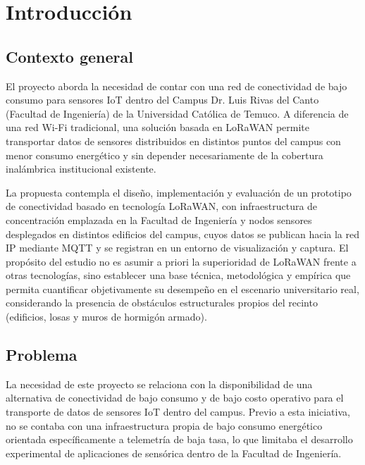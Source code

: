 \documentclass[12pt,oneside,openany,spanish,oldfontcommands]{memoir}
\begin{document}
\clearpage
{}
\setcounter{page}{1}
\pagestyle{mainstyle}

\chapter{Introducción}

\section{Contexto general}

El proyecto aborda la necesidad de contar con una red de conectividad de bajo consumo
para sensores IoT dentro del Campus Dr. Luis Rivas del Canto (Facultad de Ingeniería) de
la Universidad Católica de Temuco. A diferencia de una red Wi-Fi tradicional, una solución
basada en LoRaWAN permite transportar datos de sensores distribuidos en distintos
puntos del campus con menor consumo energético y sin depender necesariamente de la
cobertura inalámbrica institucional existente.

La propuesta contempla el diseño, implementación y evaluación de un prototipo de conectividad
basado en tecnología LoRaWAN, con infraestructura de concentración emplazada en la Facultad de
Ingeniería y nodos sensores desplegados en distintos edificios del campus, cuyos datos se
publican hacia la red IP mediante MQTT y se registran en un entorno de visualización y captura.
El propósito del estudio no es asumir a priori la superioridad de LoRaWAN frente a otras
tecnologías, sino establecer una base técnica, metodológica y empírica que permita cuantificar
objetivamente su desempeño en el escenario universitario real, considerando la presencia de
obstáculos estructurales propios del recinto (edificios, losas y muros de hormigón armado).

\section{Problema}

La necesidad de este proyecto se relaciona con la disponibilidad de una alternativa de
conectividad de bajo consumo y de bajo costo operativo para el transporte de datos de
sensores IoT dentro del campus. Previo a esta iniciativa, no se contaba con una infraestructura
propia de bajo consumo energético orientada específicamente a telemetría de baja tasa, lo que
limitaba el desarrollo experimental de aplicaciones de sensórica dentro de la Facultad de
Ingeniería.
\end{document}
